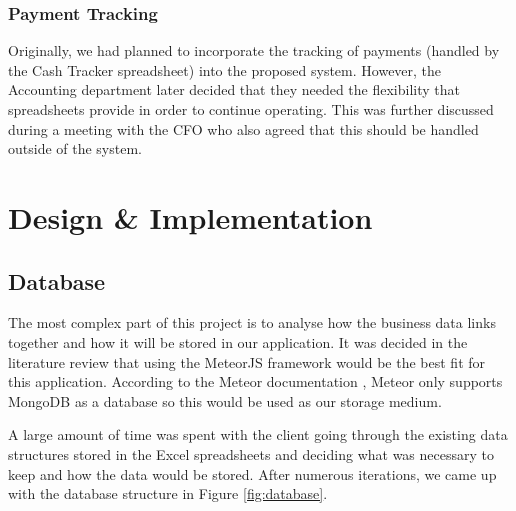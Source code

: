 \documentclass[12pt]{article}
\begin{document}
\subsubsection*{Payment Tracking}
Originally, we had planned to incorporate the tracking of payments (handled by the Cash Tracker spreadsheet) into the proposed system. However, the Accounting department later decided that they needed the flexibility that spreadsheets provide in order to continue operating. This was further discussed during a meeting with the CFO who also agreed that this should be handled outside of the system.

\section{Design \& Implementation}
\subsection{Database}
The most complex part of this project is to analyse how the business data links together and how it will be stored in our application. It was decided in the literature review that using the MeteorJS framework would be the best fit for this application. According to the Meteor documentation \cite{meteor_collections_guide}, Meteor only supports MongoDB as a database so this would be used as our storage medium.

A large amount of time was spent with the client going through the existing data structures stored in the Excel spreadsheets and deciding what was necessary to keep and how the data would be stored. After numerous iterations, we came up with the database structure in Figure \ref{fig:database}.
\end{document}
